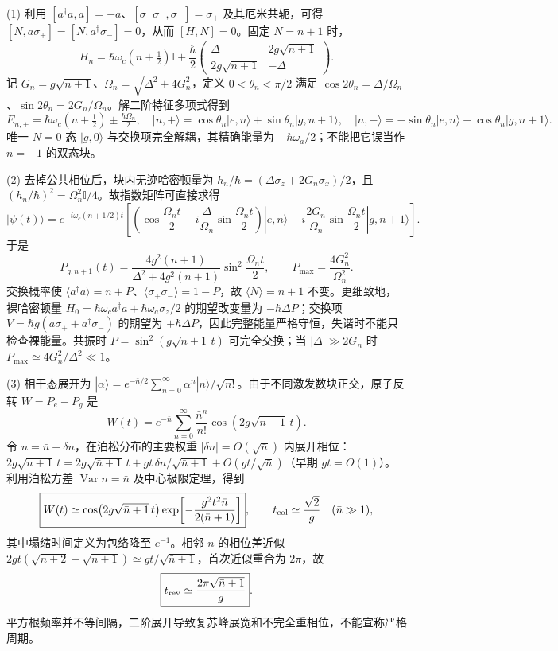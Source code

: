 (1) 利用 \([a^\dagger a,a]=-a\)、\([\sigma_+\sigma_-,\sigma_+]=\sigma_+\) 及其厄米共轭，可得 \([N,a\sigma_+]=[N,a^\dagger\sigma_-]=0\)，从而 \([H,N]=0\)。固定 \(N=n+1\) 时，
\[
H_n=\hbar\omega_c(n+\tfrac12)\mathbb I+
\frac{\hbar}{2}\begin{pmatrix}\Delta&2g\sqrt{n+1}\\2g\sqrt{n+1}&-\Delta\end{pmatrix}.
\]
记 \(G_n=g\sqrt{n+1}\)、\(\Omega_n=\sqrt{\Delta^2+4G_n^2}\)，定义 \(0<\theta_n<\pi/2\) 满足
\(\cos2\theta_n=\Delta/\Omega_n\)、\(\sin2\theta_n=2G_n/\Omega_n\)。解二阶特征多项式得到
\[
\boxed{E_{n,\pm}=\hbar\omega_c(n+\tfrac12)\pm\tfrac{\hbar\Omega_n}{2}},\quad
|n,+\rangle=\cos\theta_n|e,n\rangle+\sin\theta_n|g,n+1\rangle,\quad
|n,-\rangle=-\sin\theta_n|e,n\rangle+\cos\theta_n|g,n+1\rangle.
\]
唯一 \(N=0\) 态 \(|g,0\rangle\) 与交换项完全解耦，其精确能量为 \(-\hbar\omega_a/2\)；不能把它误当作 \(n=-1\) 的双态块。

(2) 去掉公共相位后，块内无迹哈密顿量为 \(h_n/\hbar=(\Delta\sigma_z+2G_n\sigma_x)/2\)，且 \((h_n/\hbar)^2=\Omega_n^2\mathbb I/4\)。故指数矩阵可直接求得
\[
|\psi(t)\rangle=e^{-i\omega_c(n+1/2)t}
\left[\left(\cos\frac{\Omega_nt}{2}-i\frac{\Delta}{\Omega_n}\sin\frac{\Omega_nt}{2}\right)|e,n\rangle
-i\frac{2G_n}{\Omega_n}\sin\frac{\Omega_nt}{2}|g,n+1\rangle\right].
\]
于是
\[
\boxed{P_{g,n+1}(t)=\frac{4g^2(n+1)}{\Delta^2+4g^2(n+1)}
\sin^2\!\frac{\Omega_nt}{2}},\qquad
P_{\max}=\frac{4G_n^2}{\Omega_n^2}.
\]
交换概率使 \(\langle a^\dagger a\rangle=n+P\)、\(\langle\sigma_+\sigma_-\rangle=1-P\)，故 \(\langle N\rangle=n+1\) 不变。更细致地，裸哈密顿量 \(H_0=\hbar\omega_ca^\dagger a+\hbar\omega_a\sigma_z/2\) 的期望改变量为 \(-\hbar\Delta P\)；交换项 \(V=\hbar g(a\sigma_++a^\dagger\sigma_-)\) 的期望为 \(+\hbar\Delta P\)，因此完整能量严格守恒，失谐时不能只检查裸能量。共振时 \(P=\sin^2(g\sqrt{n+1}\,t)\) 可完全交换；当 \(|\Delta|\gg2G_n\) 时 \(P_{\max}\simeq4G_n^2/\Delta^2\ll1\)。

(3) 相干态展开为 \(|\alpha\rangle=e^{-\bar n/2}\sum_{n=0}^\infty\alpha^n|n\rangle/\sqrt{n!}\)。由于不同激发数块正交，原子反转 \(W=P_e-P_g\) 是
\[
\boxed{W(t)=e^{-\bar n}\sum_{n=0}^\infty\frac{\bar n^n}{n!}
\cos\!\left(2g\sqrt{n+1}\,t\right)}.
\]
令 \(n=\bar n+\delta n\)，在泊松分布的主要权重 \(|\delta n|=O(\sqrt{\bar n})\) 内展开相位：
\(2g\sqrt{n+1}\,t=2g\sqrt{\bar n+1}\,t+
gt\,\delta n/\sqrt{\bar n+1}+O(gt/\sqrt{\bar n})\)（早期 \(gt=O(1)\)）。
利用泊松方差 \(\operatorname{Var}n=\bar n\) 及中心极限定理，得到
\[
\boxed{W(t)\simeq
\cos\!\left(2g\sqrt{\bar n+1}\,t\right)
\exp\!\left[-\frac{g^2t^2\bar n}{2(\bar n+1)}\right]},\qquad
t_{\rm col}\simeq\frac{\sqrt2}{g}\quad(\bar n\gg1),
\]
其中塌缩时间定义为包络降至 \(e^{-1}\)。相邻 \(n\) 的相位差近似
\(2gt(\sqrt{n+2}-\sqrt{n+1})\simeq gt/\sqrt{\bar n+1}\)，首次近似重合为 \(2\pi\)，故
\[
\boxed{t_{\rm rev}\simeq\frac{2\pi\sqrt{\bar n+1}}g}.
\]
平方根频率并不等间隔，二阶展开导致复苏峰展宽和不完全重相位，不能宣称严格周期。

